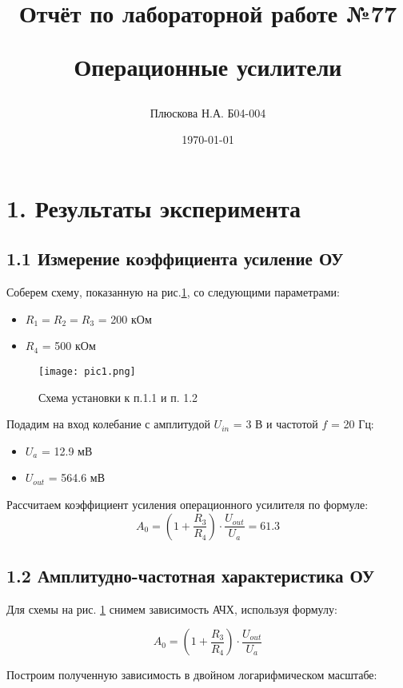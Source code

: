 \documentclass[a4paper,12pt]{report}
\title{Отчёт по лабораторной работе №77

Операционные усилители}
\author{Плюскова Н.А. Б04-004 }
\date{\today}
\begin{document}
\maketitle

\section*{1. Результаты эксперимента}
\subsection*{1.1 Измерение коэффициента усиление ОУ}

Соберем схему, показанную на рис.\ref{p1}, со следующими параметрами:
\begin{itemize}
    \item $R_{1} = R_{2} = R_{3}$ = 200 кОм
    \item $R_{4}$ = 500 кОм
\end{itemize}

\begin{figure}[H]
    \texttt{[image: pic1.png]}
    \caption{Схема установки к п.1.1 и п. 1.2}
    \label{p1}
\end{figure}

Подадим на вход колебание с амплитудой $U_{in}$ = 3 В и частотой $f$ = 20 Гц:
\begin{itemize}
    \item $U_{a}$ = 12.9 мВ
    \item $U_{out}$ = 564.6 мВ
\end{itemize}

Рассчитаем коэффициент усиления операционного усилителя по формуле:
\begin{equation*}
    A_{0} = (1 + \frac{R_{3}}{R_{4}})\cdot \frac{U_{out}}{U_{a}} = 61.3
\end{equation*}

\subsection*{1.2 Амплитудно-частотная характеристика ОУ}

Для схемы на рис. \ref{p1} снимем зависимость АЧХ, используя формулу:

\begin{equation*}
    A_{0} = (1 + \frac{R_{3}}{R_{4}})\cdot \frac{U_{out}}{U_{a}}
\end{equation*}

Построим полученную зависимость в двойном логарифмическом масштабе:
\end{document}
